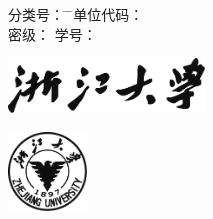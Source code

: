 
\thispagestyle{empty}

\begin{tabbing}
\Songti\xiaosi 分类号： \= \underline{\makebox[4cm]{\xiaosi\zjuclass}} \= \hspace{4cm} \= \Songti\xiaosi 单位代码：\underline{} \\
\Songti\xiaosi 密\hspace{4.22mm}级： \> \underline{\makebox[4cm]{\zjusecurity}} \> \> \Songti\xiaosi 学\hspace{8.44mm}号：\underline{\makebox[3cm]{\zjuauthorid}}
\end{tabbing}

\vspace{5mm}

\begin{center}
  \includegraphics[width=52mm]{images/zjuname.pdf}%
\end{center}


\vspace{4mm}

\begin{center}
  \includegraphics[width=21mm]{images/zjulogo.pdf}%
\end{center}

\vspace{8mm}

